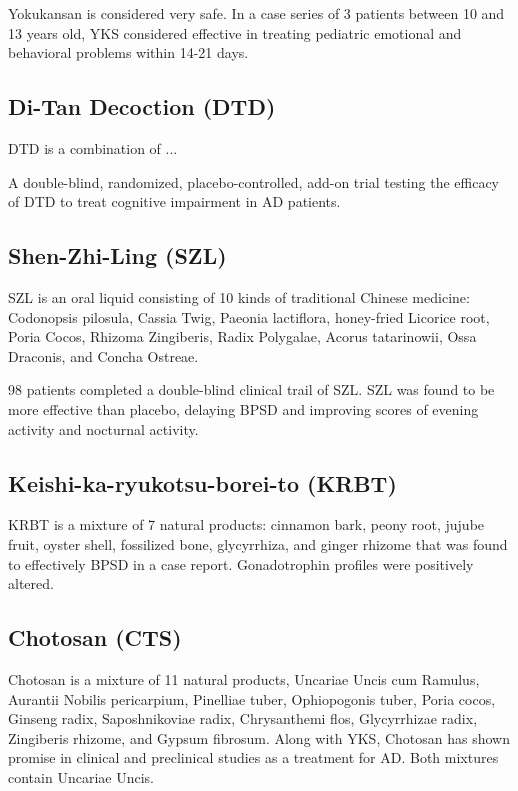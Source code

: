 \documentclass[twocolumn]{article}
\begin{document}
Yokukansan is considered very safe.
In a case series of 3 patients between 10 and 13 years old,
YKS considered effective in treating pediatric emotional and behavioral problems
within 14-21 days.
\cite{tanaka2013potential}


\subsection{Di-Tan Decoction (DTD)}
DTD is a combination of ...

A double-blind, randomized, placebo-controlled, add-on trial
testing the efficacy of DTD to treat cognitive impairment
in AD patients.
\cite{chua2015efficacy}


\subsection{Shen-Zhi-Ling (SZL)}
SZL is an oral liquid consisting of 10 kinds of traditional Chinese medicine:
Codonopsis pilosula, Cassia Twig, Paeonia lactiflora,
honey-fried Licorice root, Poria Cocos, Rhizoma Zingiberis, Radix Polygalae,
Acorus tatarinowii, Ossa Draconis, and Concha Ostreae.

98 patients completed a double-blind clinical trail of SZL.
SZL was found to be more effective than placebo,
delaying BPSD and improving scores of evening activity
and nocturnal activity.
\cite{pan2014shen}




\subsection{Keishi-ka-ryukotsu-borei-to (KRBT)}

KRBT is a mixture of 7 natural products:
cinnamon bark,
peony root,
jujube fruit,
oyster shell,
fossilized bone,
glycyrrhiza,
and ginger rhizome
that was found to effectively BPSD in a case report.
Gonadotrophin profiles were positively altered.
\cite{niitsu2013behavioural}




\subsection{Chotosan (CTS)}
Chotosan is a mixture of 11 natural products,
Uncariae Uncis cum Ramulus,
Aurantii Nobilis pericarpium,
Pinelliae tuber,
Ophiopogonis tuber,
Poria cocos,
Ginseng radix,
Saposhnikoviae radix,
Chrysanthemi flos,
Glycyrrhizae radix,
Zingiberis rhizome,
and Gypsum fibrosum.
Along with YKS, Chotosan has shown promise in clinical and
preclinical studies as a treatment for AD.
Both mixtures contain Uncariae Uncis.
\cite{matsumoto2013kampo}
\end{document}

